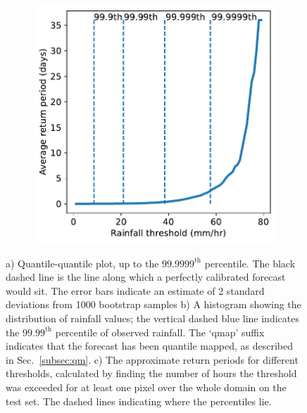\documentclass[../main.tex]{subfiles}
\begin{document}
\begin{figure}[!ht]
\begin{subfigure}[h]{0.5\textwidth}
         \caption{}
        \centering
    \end{subfigure}
    \begin{subfigure}{0.48\textwidth}
     \includegraphics[width=\textwidth]{images/return_periods.pdf}
     \caption{}
     \end{subfigure}
     \centering
     \caption{a) Quantile-quantile plot, up to the $99.9999^{\text{th}}$ percentile. The black dashed line is the line along which a perfectly calibrated forecast would sit. The error bars indicate an estimate of 2 standard deviations from 1000 bootstrap samples b) A histogram showing the distribution of rainfall values; the vertical dashed blue line indicates the $99.99^{\text{th}}$ percentile of observed rainfall. The `qmap' suffix indicates that the forecast has been quantile mapped, as described in Sec.~\ref{subsec:qm}. c) The approximate return periods for different thresholds, calculated by finding the number of hours the threshold was exceeded for at least one pixel over the whole domain on the test set. The dashed lines indicating where the percentiles lie. }
     \label{fig:distribution}
\end{figure}
\end{document}
